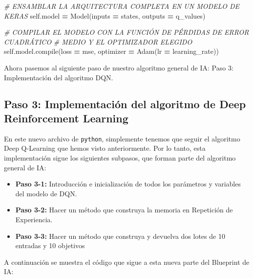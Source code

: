 \documentclass[
]{book}
\newenvironment{Shaded}{\begin{snugshade}}{\end{snugshade}}
\newcommand{\BuiltInTok}[1]{#1}
\newcommand{\CommentTok}[1]{\textcolor[rgb]{0.56,0.35,0.01}{\textit{#1}}}
\newcommand{\NormalTok}[1]{#1}
\newcommand{\OperatorTok}[1]{\textcolor[rgb]{0.81,0.36,0.00}{\textbf{#1}}}
\newcommand{\StringTok}[1]{\textcolor[rgb]{0.31,0.60,0.02}{#1}}
\newcommand{\VariableTok}[1]{\textcolor[rgb]{0.00,0.00,0.00}{#1}}
\providecommand{\tightlist}{%
  \setlength{\itemsep}{0pt}\setlength{\parskip}{0pt}}
\begin{document}
\begin{Shaded}
\begin{Highlighting}[]
        \CommentTok{\# ENSAMBLAR LA ARQUITECTURA COMPLETA EN UN MODELO DE KERAS}
        \VariableTok{self}\NormalTok{.model }\OperatorTok{=}\NormalTok{ Model(inputs }\OperatorTok{=}\NormalTok{ states, outputs }\OperatorTok{=}\NormalTok{ q\_values)}
        
        \CommentTok{\# COMPILAR EL MODELO CON LA FUNCIÓN DE PÉRDIDAS DE ERROR CUADRÁTICO }
        \CommentTok{\# MEDIO Y EL OPTIMIZADOR ELEGIDO}
        \VariableTok{self}\NormalTok{.model.}\BuiltInTok{compile}\NormalTok{(loss }\OperatorTok{=} \StringTok{\textquotesingle{}mse\textquotesingle{}}\NormalTok{, optimizer }\OperatorTok{=}\NormalTok{ Adam(lr }\OperatorTok{=}\NormalTok{ learning\_rate))}
\end{Highlighting}
\end{Shaded}

Ahora pasemos al siguiente paso de nuestro algoritmo general de IA: Paso 3: Implementación del algoritmo DQN.

\hypertarget{paso-3-implementaciuxf3n-del-algoritmo-de-deep-reinforcement-learning}{%
\subsection{Paso 3: Implementación del algoritmo de Deep Reinforcement Learning}\label{paso-3-implementaciuxf3n-del-algoritmo-de-deep-reinforcement-learning}}

En este nuevo archivo de \texttt{python}, simplemente tenemos que seguir el algoritmo Deep Q-Learning que hemos visto anteriormente. Por lo tanto, esta implementación sigue los siguientes subpasos, que forman parte del algoritmo general de IA:

\begin{itemize}
\tightlist
\item
  \textbf{Paso 3-1:} Introducción e inicialización de todos los parámetros y variables del modelo de DQN.
\item
  \textbf{Paso 3-2:} Hacer un método que construya la memoria en Repetición de Experiencia.
\item
  \textbf{Paso 3-3:} Hacer un método que construya y devuelva dos lotes de 10 entradas y 10 objetivos
\end{itemize}

A continuación se muestra el código que sigue a esta nueva parte del Blueprint de IA:
\end{document}
